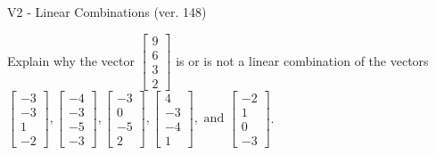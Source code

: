 \begin{exercise}
  \begin{exerciseTitle}V2 - Linear Combinations (ver. 148)\end{exerciseTitle}
  \begin{exerciseStatement}
    Explain why the vector \(\left[\begin{array}{c}
9 \\
6 \\
3 \\
2
\end{array}\right]\)  is or is not a linear 
	combination of the vectors \(\left[\begin{array}{c}
-3 \\
-3 \\
1 \\
-2
\end{array}\right] , \left[\begin{array}{c}
-4 \\
-3 \\
-5 \\
-3
\end{array}\right] , \left[\begin{array}{c}
-3 \\
0 \\
-5 \\
2
\end{array}\right] , \left[\begin{array}{c}
4 \\
-3 \\
-4 \\
1
\end{array}\right] , \text{ and } \left[\begin{array}{c}
-2 \\
1 \\
0 \\
-3
\end{array}\right]\).
	



\end{exerciseStatement}
\end{exercise}
